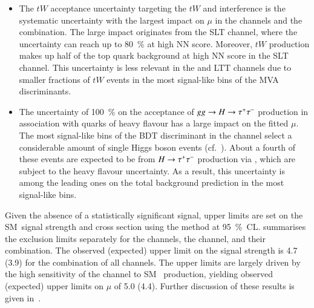 \begin{itemize}
\item The $tW$ acceptance uncertainty targeting the $tW$ and \ttbar interference
  is the systematic uncertainty with the largest impact on $\mu$ in the \lephad
  channels and the combination. The large impact originates from the \lephad SLT
  channel, where the uncertainty can reach up to \SI{80}{\percent} at high NN
  score. Moreover, $tW$ production makes up half of the top quark background at
  high NN score in the \lephad SLT channel. This uncertainty is less relevant in
  the \hadhad and \lephad LTT channels due to smaller fractions of $tW$ events
  in the most signal-like bins of the MVA discriminants.

\item The uncertainty of \SI{100}{\percent} on the acceptance of
  $gg \to H \to \tau^{+} \tau^{-}$ production in association with quarks of heavy flavour
  has a large impact on the fitted $\mu$. The most signal-like bins of the BDT
  discriminant in the \hadhad channel select a considerable amount of single
  Higgs boson events (cf.~). About a
  fourth of these events are expected to be from $H \to \tau^{+} \tau^{-}$ production via
  \ggF, which are subject to the heavy flavour uncertainty. As a result, this
  uncertainty is among the leading ones on the total background prediction in
  the most signal-like bins.

\end{itemize}
%

Given the absence of a statistically significant signal, upper limits are set on
the SM~\HH signal strength and cross section using the \CLs method at
\SI{95}{\percent}~CL.  summarises the exclusion
limits separately for the \lephad channels, the \hadhad channel, and their
combination. The observed (expected) upper limit on the signal strength is
\num{4.7} (\num{3.9}) for the combination of all channels. The upper limits are
largely driven by the high sensitivity of the \hadhad channel to SM~\HH
production, yielding observed (expected) upper limits on $\mu$ of \num{5.0}
(\num{4.4}). Further discussion of these results is given
in~.

